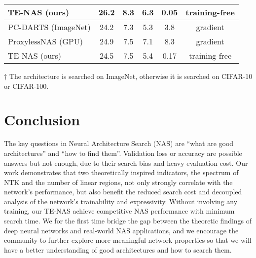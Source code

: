\documentclass{article} \usepackage{iclr2021_conference,times}
\begin{document}
\begin{table}[h!]
\begin{threeparttable}
\begin{tabular}{lccccc}
    TE-NAS (ours) & 26.2 & 8.3 & 6.3 & 0.05 & training-free \\ \midrule
    PC-DARTS (ImageNet) \citep{xu2019pc}\tnote{$\dagger$} & 24.2 & 7.3 & 5.3 & 3.8 & gradient \\
    ProxylessNAS (GPU) \citep{cai2018proxylessnas}\tnote{$\dagger$} & 24.9 & 7.5 & 7.1 & 8.3 & gradient \\
    TE-NAS (ours)\tnote{$\dagger$} & 24.5 & 7.5 & 5.4 & 0.17 & training-free \\ \bottomrule
    \end{tabular}
    \begin{tablenotes}
        \item[$\dagger$] The architecture is searched on ImageNet, otherwise it is searched on CIFAR-10 or CIFAR-100.
    \end{tablenotes}
    \end{threeparttable}
    \label{tab:imagenet}
    \vspace{-2.5mm}
\end{table}

\vspace{-0.5em}
\section{Conclusion}
\vspace{-0.5em}
The key questions in Neural Architecture Search (NAS) are ``what are good architectures'' and ``how to find them''. Validation loss or accuracy are possible answers but not enough, due to their search bias and heavy evaluation cost. Our work demonstrates that two theoretically inspired indicators, the spectrum of NTK and the number of linear regions, not only strongly correlate with the network's performance, but also benefit the reduced search cost and decoupled analysis of the network's trainability and expressivity. Without involving any training, our TE-NAS achieve competitive NAS performance with minimum search time. We for the first time bridge the gap between the theoretic findings of deep neural networks and real-world NAS applications, and we encourage the community to further explore more meaningful network properties so that we will have a better understanding of good architectures and how to search them.

\vspace{-0.5em}
\end{document}
